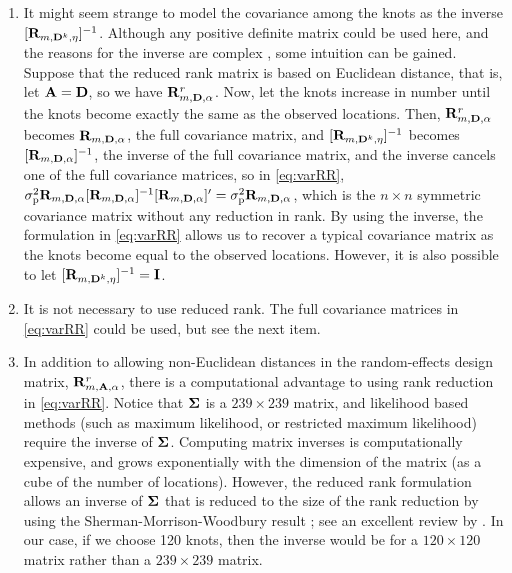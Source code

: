 \documentclass[11pt, titlepage]{article}\usepackage[]{graphicx}\usepackage[]{color}
\begin{document}
\begin{spacing}{1.9}
\begin{flushleft}
\begin{enumerate}
		\item It might seem strange to model the covariance among the knots as the inverse $[\mathbf{R}_{m,\mathbf{D}^k,\eta}]^{-1}$. Although any positive definite matrix could be used here, and the reasons for the inverse are complex \citep{Bane:Gelf:Finl:Sang:gaus:2008}, some intuition can be gained.  Suppose that the reduced rank matrix is based on Euclidean distance, that is, let $\mathbf{A} = \mathbf{D}$, so we have $\mathbf{R}^r_{m,\mathbf{D},\alpha}$. Now, let the knots increase in number until the knots become exactly the same as the observed locations. Then, $\mathbf{R}^r_{m,\mathbf{D},\alpha}$ becomes $\mathbf{R}_{m,\mathbf{D},\alpha}$, the full covariance matrix, and $[\mathbf{R}_{m,\mathbf{D}^k,\eta}]^{-1}$ becomes $[\mathbf{R}_{m,\mathbf{D},\alpha}]^{-1}$, the inverse of the full covariance matrix, and the inverse cancels one of the full covariance matrices, so in \ref{eq:varRR}, $\sigma^2_\textrm{p}\mathbf{R}_{m,\mathbf{D},\alpha}[\mathbf{R}_{m,\mathbf{D},\alpha}]^{-1}[\mathbf{R}_{m,\mathbf{D},\alpha}]^{\prime} = \sigma^2_\textrm{p}\mathbf{R}_{m,\mathbf{D},\alpha}$, which is the $n \times n$ symmetric covariance matrix without any reduction in rank.  By using the inverse, the formulation in \ref{eq:varRR} allows us to recover a typical covariance matrix as the knots become equal to the observed locations.  However, it is also possible to let $[\mathbf{R}_{m,\mathbf{D}^k,\eta}]^{-1} = \mathbf{I}$.
		\item It is not necessary to use reduced rank.  The full covariance matrices in \ref{eq:varRR} could be used, but see the next item.
		\item In addition to allowing non-Euclidean distances in the random-effects design matrix, $\mathbf{R}^r_{m,\mathbf{A},\alpha}$, there is a computational advantage to using rank reduction in \ref{eq:varRR}.  Notice that $\mbox{\boldmath $\Sigma$}$ is a $239 \times 239$ matrix, and likelihood based methods (such as maximum likelihood, or restricted maximum likelihood) require the inverse of $\mbox{\boldmath $\Sigma$}$.  Computing matrix inverses is computationally expensive, and grows exponentially with the dimension of the matrix (as a cube of the number of locations).  However, the reduced rank formulation allows an inverse of $\mbox{\boldmath $\Sigma$}$ that is reduced to the size of the rank reduction by using the Sherman-Morrison-Woodbury result \citep{Sher:Morr:adju:1949,Wood:inve:1950}; see an excellent review by \citet{Hend:Sear:on:1981}. In our case, if we choose 120 knots, then the inverse would be for a $120 \times 120$ matrix rather than a $239 \times 239$ matrix.
		
\end{enumerate}


\end{flushleft}
\end{spacing}
\end{document}
